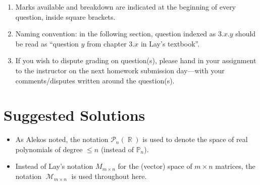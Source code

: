 \documentclass{amsart}
\theoremstyle{definition}
\theoremstyle{definition}
\DeclareMathOperator{\R}{\mathbb{R}}
\DeclareMathOperator{\1}{\mathbbm{1}}
\DeclareMathOperator{\MM}{\mathcal{M}}
\renewcommand{\leq}{\leqslant}
\newcommand{\polyn}[2]{\mathcal{P}_{#1}(#2)}
\begin{document}
\begin{enumerate}[itemsep=.75em]
		\item Marks available and breakdown are indicated at the beginning of every question, inside square brackets. 
		
		\item Naming convention: in the following section, question indexed as $3.x.y$ should be read as ``question $y$ from chapter $3.x$ in Lay's textbook''.
		
		\item If you wish to dispute grading on question(s), please hand in your assignment to the instructor on the next homework submission day---with your comments/disputes written around the question(s).
		
	\end{enumerate}
	
	
	
	\clearpage
	
	\section*{Suggested Solutions}
	
	\begin{itemize}
		\item As Alekos noted, the notation $\polyn{n}{\R}$ is used to denote the space of real polynomials of degree $\leq n$ (instead of $\mathbb{P}_n$).
		\item Instead of Lay's notation $M_{m \times n}$ for the (vector) space of $m \times n$ matrices, the notation $\MM_{m \times n}$ is used throughout here.
	\end{itemize}
	
	\bigskip
	
\end{document}

